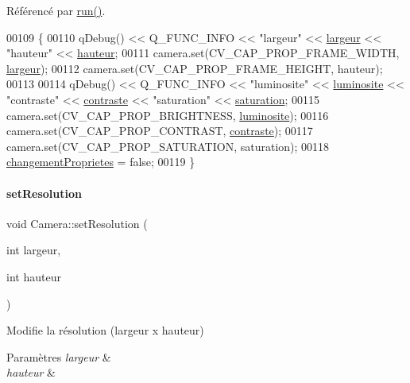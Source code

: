 Référencé par \hyperlink{camera_8cpp_source_l00068}{run()}.


\begin{DoxyCode}
00109 \{
00110     qDebug() << Q\_FUNC\_INFO << \textcolor{stringliteral}{"largeur"} << \hyperlink{class_camera_ad64f26cdfc5aa561208b273d430938cf}{largeur} << \textcolor{stringliteral}{"hauteur"} << 
      \hyperlink{class_camera_a5d89d7f9d1a5eab4175dd168c7fbf1c7}{hauteur};
00111     camera.set(CV\_CAP\_PROP\_FRAME\_WIDTH, \hyperlink{class_camera_ad64f26cdfc5aa561208b273d430938cf}{largeur});
00112     camera.set(CV\_CAP\_PROP\_FRAME\_HEIGHT, hauteur);
00113 
00114     qDebug() << Q\_FUNC\_INFO << \textcolor{stringliteral}{"luminosite"} << \hyperlink{class_camera_aca5433bf19773161142d73009469b1ed}{luminosite} << \textcolor{stringliteral}{"contraste"} << 
      \hyperlink{class_camera_ad3b300e52c91341d985d3b54f562a0f7}{contraste} << \textcolor{stringliteral}{"saturation"} << \hyperlink{class_camera_afd46d6d2451ee33b68dbc74713f2687c}{saturation};
00115     camera.set(CV\_CAP\_PROP\_BRIGHTNESS, \hyperlink{class_camera_aca5433bf19773161142d73009469b1ed}{luminosite});
00116     camera.set(CV\_CAP\_PROP\_CONTRAST, \hyperlink{class_camera_ad3b300e52c91341d985d3b54f562a0f7}{contraste});
00117     camera.set(CV\_CAP\_PROP\_SATURATION, saturation);
00118     \hyperlink{class_camera_a50d2b3ef5c08f8b61bbe2115d71005bd}{changementProprietes} = \textcolor{keyword}{false};
00119 \}
\end{DoxyCode}
\mbox{\label{class_camera_a966d13a5bf22c776f8d776d3da19182a}} 
\paragraph{\texorpdfstring{set\+Resolution}{setResolution}\hspace{0.1cm}{\footnotesize\ttfamily [1/3]}}
{\footnotesize\ttfamily void Camera\+::set\+Resolution (\begin{DoxyParamCaption}\item[{int}]{largeur,  }\item[{int}]{hauteur }\end{DoxyParamCaption})\hspace{0.3cm}{\ttfamily [slot]}}



Modifie la résolution (largeur x hauteur) 


\begin{DoxyParams}{Paramètres}
{\em largeur} & \\
\hline
{\em hauteur} & \\
\hline
\end{DoxyParams}



